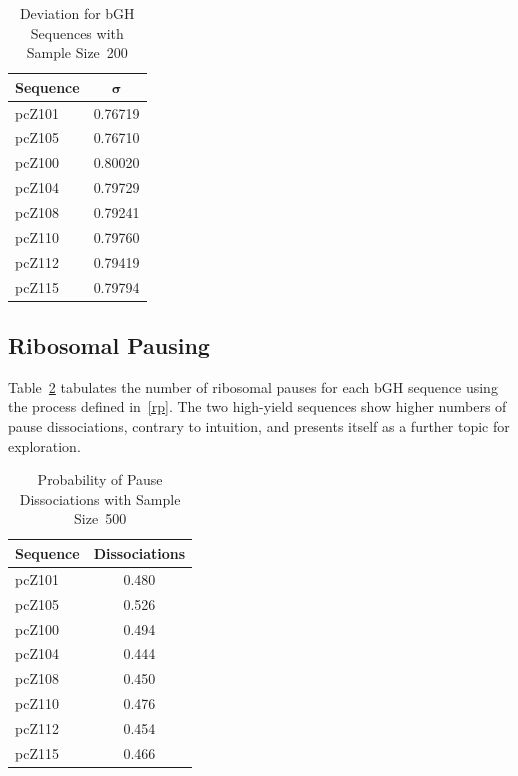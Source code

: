\documentclass[10pt,twocolumn]{article}
\begin{document}
\begin{table}[tbp]
\begin{center}
    \begin{tabular}{lc}
        \toprule
        \textbf{Sequence} & $\mathbf{\sigma}$\\
        \midrule
        pcZ101 & 0.76719\\
        pcZ105 & 0.76710\\
        \midrule
        pcZ100 & 0.80020\\
        pcZ104 & 0.79729\\
        pcZ108 & 0.79241\\
        pcZ110 & 0.79760\\
        pcZ112 & 0.79419\\
        pcZ115 & 0.79794\\
        \bottomrule
    \end{tabular}
    \caption{Deviation for bGH Sequences with Sample Size~200}
    \label{deviation}
\end{center}
\end{table}

\subsection{Ribosomal Pausing}

Table~\ref{wichita} tabulates the number of ribosomal pauses for each bGH sequence
using the process defined in~\ref{rp}. The two high-yield sequences show higher numbers of pause
dissociations, contrary to intuition, and presents itself as a further topic for exploration.

\begin{table}[tbp]
\begin{center}
    \begin{tabular}{lc}
        \toprule
        \textbf{Sequence} & \textbf{Dissociations}\\
        \midrule
        pcZ101 & 0.480\\
        pcZ105 & 0.526\\
        \midrule
        pcZ100 & 0.494\\
        pcZ104 & 0.444\\
        pcZ108 & 0.450\\
        pcZ110 & 0.476\\
        pcZ112 & 0.454\\
        pcZ115 & 0.466\\
        \bottomrule
    \end{tabular}
    \caption{Probability of Pause Dissociations with Sample Size~500}
    \label{wichita}
\end{center}
\end{table}
\end{document}
